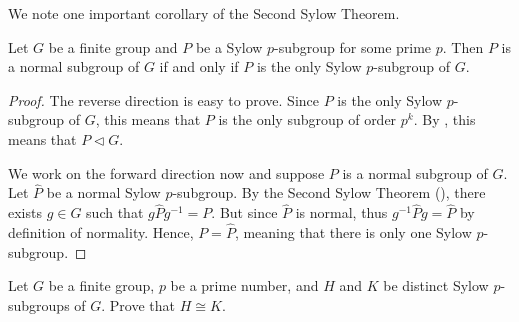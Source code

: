 \newpage

We note one important corollary of the Second Sylow Theorem.
\begin{corollary}\label{corollary-sylow-subgroup-is-normal-if-it-is-unique}
    Let $G$ be a finite group and $P$ be a Sylow $p$-subgroup for some prime $p$. Then $P$ is a normal subgroup of $G$ if and only if $P$ is the only Sylow $p$-subgroup of $G$.
\end{corollary}
\begin{proof}
    The reverse direction is easy to prove. Since $P$ is the only Sylow $p$-subgroup of $G$, this means that $P$ is the only subgroup of order $p^k$. By , this means that $P \lhd G$.

    We work on the forward direction now and suppose $P$ is a normal subgroup of $G$. Let $\hat{P}$ be a normal Sylow $p$-subgroup. By the Second Sylow Theorem (), there exists $g \in G$ such that $g\hat{P}g^{-1} = P$. But since $\hat{P}$ is normal, thus $g^{-1}\hat{P}g = \hat{P}$ by definition of normality. Hence, $P = \hat{P}$, meaning that there is only one Sylow $p$-subgroup.
\end{proof}

\begin{exercise}
    Let $G$ be a finite group, $p$ be a prime number, and $H$ and $K$ be distinct Sylow $p$-subgroups of $G$. Prove that $H \cong K$.
\end{exercise}

\newpage

